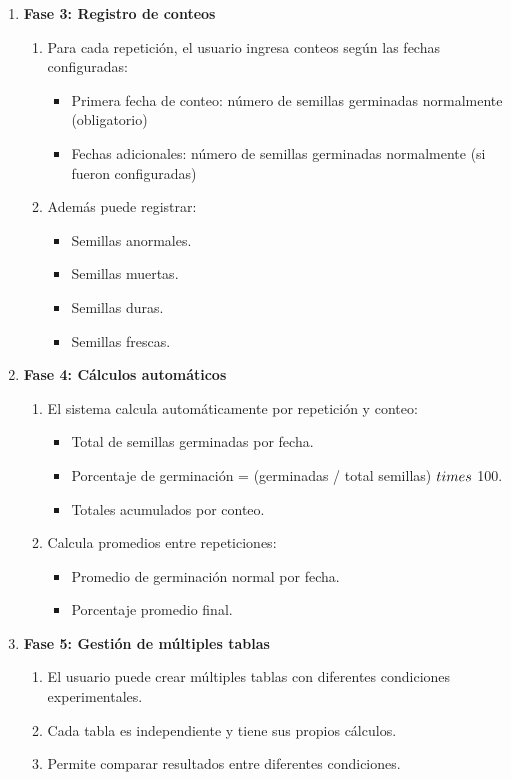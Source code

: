 \begin{enumerate}[nosep]
    \item \textbf{Fase 3: Registro de conteos}
    \begin{enumerate}[nosep]
        \item Para cada repetición, el usuario ingresa conteos según las fechas configuradas:
        \begin{itemize}[nosep]
            \item Primera fecha de conteo: número de semillas germinadas normalmente (obligatorio)
            \item Fechas adicionales: número de semillas germinadas normalmente (si fueron configuradas)
        \end{itemize}
        \item Además puede registrar:
        \begin{itemize}[nosep]
            \item Semillas anormales.
            \item Semillas muertas.
            \item Semillas duras.
            \item Semillas frescas.
        \end{itemize}
    \end{enumerate}

    \item \textbf{Fase 4: Cálculos automáticos}
    \begin{enumerate}[nosep]
        \item El sistema calcula automáticamente por repetición y conteo:
        \begin{itemize}[nosep]
            \item Total de semillas germinadas por fecha.
            \item Porcentaje de germinación = (germinadas / total semillas) $\\times$ 100.
            \item Totales acumulados por conteo.
        \end{itemize}
        \item Calcula promedios entre repeticiones:
        \begin{itemize}[nosep]
            \item Promedio de germinación normal por fecha.
            \item Porcentaje promedio final.
        \end{itemize}
    \end{enumerate}

    \item \textbf{Fase 5: Gestión de múltiples tablas}
    \begin{enumerate}[nosep]
        \item El usuario puede crear múltiples tablas con diferentes condiciones experimentales.
        \item Cada tabla es independiente y tiene sus propios cálculos.
        \item Permite comparar resultados entre diferentes condiciones.
    \end{enumerate}
\end{enumerate}

